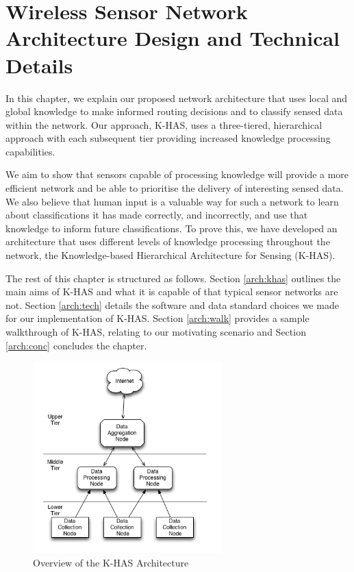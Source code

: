 \chapter{Wireless Sensor Network Architecture Design and Technical Details}\label{chap:arch}
	In this chapter, we explain our proposed network architecture that uses local and global knowledge to make informed routing decisions and to classify sensed data within the network. Our approach, K-HAS, uses a three-tiered, hierarchical approach with each subsequent tier providing increased knowledge processing capabilities. 

	We aim to show that sensors capable of processing knowledge will provide a more efficient network and be able to prioritise the delivery of interesting sensed data. We also believe that human input is a valuable way for such a network to learn about classifications it has made correctly, and incorrectly, and use that knowledge to inform future classifications. To prove this, we have developed an architecture that uses different levels of knowledge processing throughout the network, the Knowledge-based Hierarchical Architecture for Sensing (K-HAS).

	The rest of this chapter is structured as follows. Section \ref{arch:khas} outlines the main aims of K-HAS and what it is capable of that typical sensor networks are not. Section \ref{arch:tech} details the software and data standard choices we made for our implementation of K-HAS. Section \ref{arch:walk} provides a sample walkthrough of K-HAS, relating to our motivating scenario and Section \ref{arch:conc} concludes the chapter.

	\begin{figure}[h]
			\centering
			\includegraphics[width=0.65\textwidth]{Chap4/figures/khasarch} 
			\caption{Overview of the K-HAS Architecture}
			\label{arch:khas:arch}
			\end{figure}
	

